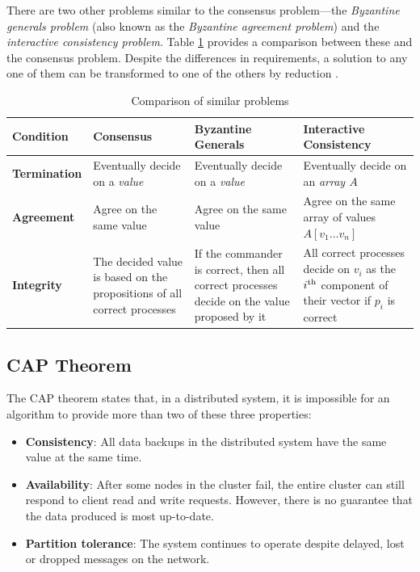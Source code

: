 \documentclass[12pt, a4paper]{article}
\begin{document}
There are two other problems similar to the consensus problem---the
\textit{Byzantine generals problem} (also known as the \textit{Byzantine
agreement problem}) and the \textit{interactive consistency problem}. Table
\ref{tab:dbtap} provides a comparison between these and the consensus problem.
Despite the differences in requirements, a solution to any one of them can be
transformed to one of the others by reduction \cite{fischer1983consensus}.

\begin{table}[htp]
  \centering
  \begin{tabularx}{\linewidth}{%
    l%
    >{\raggedright\arraybackslash}X%
    >{\raggedright\arraybackslash}X%
    >{\raggedright\arraybackslash}X}
  \toprule
  Condition & Consensus & Byzantine Generals & Interactive Consistency \\
  \midrule
  \textbf{Termination} & Eventually decide on a \textit{value}
    & Eventually decide on a \textit{value}
    & Eventually decide on an \textit{array $A$} \\
  \addlinespace
  \textbf{Agreement} & Agree on the same value
    & Agree on the same value
    & Agree on the same array of values $A[v_{1} \ldots v_{n}]$ \\
  \addlinespace
  \textbf{Integrity}
    & The decided value is based on the propositions of all correct processes
    & If the commander is correct, then all correct processes decide on the
      value proposed by it
    & All correct processes decide on $v_{i}$ as the $i\textsuperscript{th}$
      component of their vector if $p_{i}$ is correct \\
  \bottomrule
\end{tabularx}
  \caption{Comparison of similar problems}
  \label{tab:dbtap}
\end{table}

\subsection{CAP Theorem} \label{sec:cap-theorem}

The CAP theorem \cite{brewer2012cap} states that, in a distributed system, it is
impossible for an algorithm to provide more than two of these three properties:

\begin{itemize}
	\item \textbf{Consistency}: All data backups in the distributed system have
    the same value at the same time.
	\item \textbf{Availability}: After some nodes in the cluster fail, the entire
    cluster can still respond to client read and write requests. However, there
    is no guarantee that the data produced is most up-to-date.
	\item \textbf{Partition tolerance}: The system continues to operate despite
    delayed, lost or dropped messages on the network.
\end{itemize}
\end{document}
